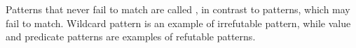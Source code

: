 Patterns that never fail to match are called , in contrast to 
 patterns, which may fail to match. Wildcard pattern is an 
example of irrefutable pattern, while value and predicate patterns are examples 
of refutable patterns. 

